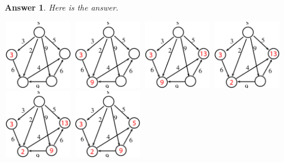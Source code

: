 \documentclass[11pt]{article}
\newtheorem{answer}{Answer}
\begin{document}
\begin{answer}
 \label{ans:2}
 Here is the answer.
\begin{center}
\includegraphics[width=3cm, height=3cm]{dgraph1}
\includegraphics[width=3cm, height=3cm]{dgraph2}
\includegraphics[width=3cm, height=3cm]{dgraph3}
\includegraphics[width=3cm, height=3cm]{dgraph4}
\includegraphics[width=3cm, height=3cm]{dgraph5}
\includegraphics[width=3cm, height=3cm]{dgraph6}
\end{center}
\end{answer}
\end{document}
